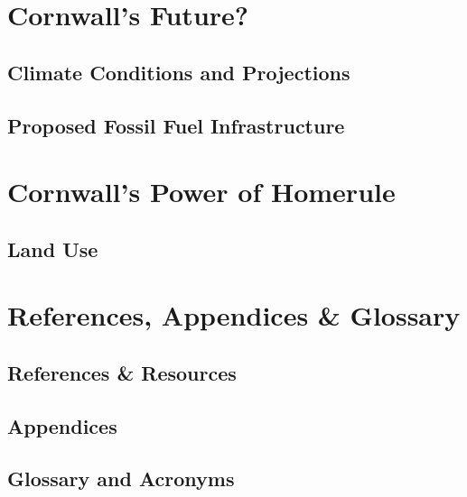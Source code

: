 \documentclass[11pt,fleqn, openany]{book} %
\begin{document}
\part{Cornwall's Future?}
\chapter{Climate Conditions and Projections}\label{sec:climate}


\chapter{Proposed Fossil Fuel Infrastructure}\label{sec:fossil}


\part{Cornwall's Power of Homerule}
\chapter{Land Use}\label{sec:landuse}



\part{References, Appendices \& Glossary}
\chapter{References \& Resources}
\label{sec:references}
\printbibliography
\chapter{Appendices}\label{sec:appendices}

\chapter{Glossary and Acronyms}\label{subsec:glossary}
\glsaddall
\renewcommand{\glossarysection}[2][]{}
\printglossary
\end{document}
